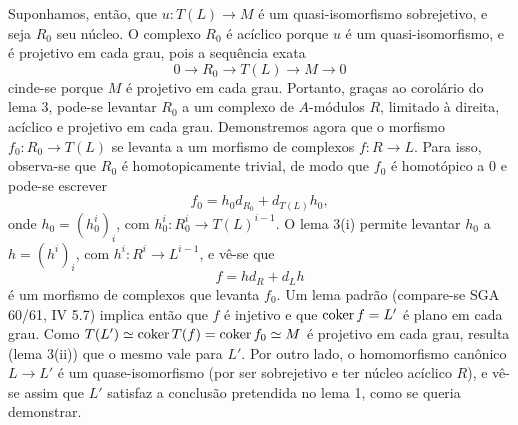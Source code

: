 Suponhamos, então, que $u:T(L)\to M$ é um quasi-isomorfismo sobrejetivo, e seja $R_0$ seu núcleo. O complexo $R_0$ é acíclico porque $u$ é um quasi-isomorfismo, e é projetivo em cada grau, pois a sequência exata
\[
0\longrightarrow R_0\longrightarrow T(L)\longrightarrow M\longrightarrow0
\]
cinde-se porque $M$ é projetivo em cada grau. Portanto, graças ao corolário do lema 3, pode-se levantar $R_0$ a um complexo de $A$-módulos $R$, limitado à direita, acíclico e projetivo em cada grau. Demonstremos agora que o morfismo $f_0:R_0\to T(L)$ se levanta a um morfismo de complexos $f:R\to L$. Para isso, observa-se que $R_0$ é homotopicamente trivial, de modo que $f_0$ é homotópico a $0$ e pode-se escrever
\[
f_0=h_0d_{R_0}+d_{T(L)}h_0,
\]
onde $h_0=(h_0^i)_i$, com $h_0^i:R_0^i\to T(L)^{i-1}$. O lema 3(i) permite levantar $h_0$ a $h=(h^i)_i$, com $h^i:R^i\to L^{i-1}$, e vê-se que
\[
f=hd_R+d_Lh
\]
é um morfismo de complexos que levanta $f_0$. Um lema padrão (compare-se SGA 60/61, IV 5.7) implica então que $f$ é injetivo e que $\operatorname{coker} f=L'$ é plano em cada grau. Como $T(L')\simeq\operatorname{coker} T(f)=\operatorname{coker} f_0\simeq M$ é projetivo em cada grau, resulta (lema 3(ii)) que o mesmo vale para $L'$. Por outro lado, o homomorfismo canônico $L\to L'$ é um quase-isomorfismo (por ser sobrejetivo e ter núcleo acíclico $R$), e vê-se assim que $L'$ satisfaz a conclusão pretendida no lema 1, como se queria demonstrar.
